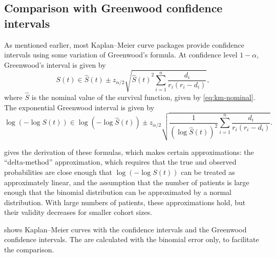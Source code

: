 \documentclass[article]{jss}
\newcommand{\KM}{Kaplan--Meier} %
\begin{document}
\subsection{Comparison with Greenwood confidence intervals}\label{sec:compare-to-greenwood}

As mentioned earlier, most \KM{} curve packages provide confidence intervals using some variation of Greenwood's formula.  At confidence level \(1-\alpha\), Greenwood's interval is given by
\begin{equation}
\label{eq:greenwood}
S(t)\in\hat{S}(t) \pm z_{\alpha/2} \sqrt{{\hat{S}(t)}^2{\sum_{i=1}^{n} \frac{d_i}{r_i(r_i-d_i)}}},
\end{equation}
where \(\hat{S}\) is the nominal value of the survival function, given by \cref{eq:km-nominal}.  The exponential Greenwood interval is given by
\begin{equation}
\label{eq:exponential-greenwood}
\log{\left(-\log S(t)\right)} \in \log{\left(-\log \hat{S}(t)\right)} \pm z_{\alpha/2} \sqrt{\frac{1}{{\left(\log \hat{S}(t)\right)}^2} \sum_{i=1}^{n} \frac{d_i}{r_i(r_i-d_i)}}.
\end{equation}

\citet{GreenwoodNotes} gives the derivation of these formulas, which makes certain approximations: the ``delta-method'' approximation, which requires that the true and observed probabilities are close enough that \(\log\left(-\log S(t)\right)\) can be treated as approximately linear, and the assumption that the number of patients is large enough that the binomial distribution can be approximated by a normal distribution.  With large numbers of patients, these approximations hold, but their validity decreases for smaller cohort sizes.

 shows \KM{} curves with the  confidence intervals and the Greenwood confidence intervals.  The  are calculated with the binomial error only, to facilitate the comparison.
\end{document}
